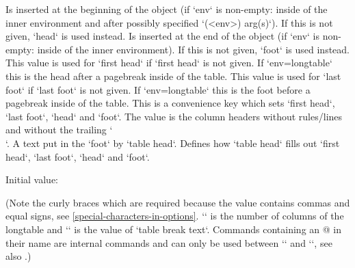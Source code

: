   Is inserted at the beginning of the object (if `env` is non-empty: inside of the inner environment and after possibly specified `(<env>) arg(s)`).
  If this is not given, `head` is used instead.
  Is inserted at the end of the object (if `env` is non-empty: inside of the inner environment).
  If this is not given, `foot` is used instead.
  This value is used for `first head` if `first head` is not given.
  If `env=longtable` this is the head after a pagebreak inside of the table.
  This value is used for `last foot` if `last foot` is not given.
  If `env=longtable` this is the foot before a pagebreak inside of the table.
  This is a convenience key which sets `first head`, `last foot`, `head` and `foot`.
  The value is the column headers without rules\slash lines and without the trailing `\\`.
  A text put in the `foot` by `table head`.
  Defines how `table head` fills out `first head`, `last foot`, `head` and `foot`.

  Initial value:


  (Note the curly braces which are required because the value contains commas and equal signs, see \cref{special-characters-in-options}.
   `\the\LT@cols` is the number of columns of the longtable and `\object@tableBreakText` is the value of `table break text`.
   Commands containing an @ in their name are internal commands and can only be used between `\makeatletter` and `\makeatother`, see also \autocite{texexchange_make_at}.)

\bigpar

